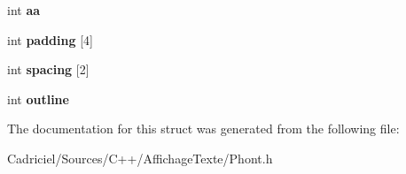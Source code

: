 \begin{DoxyCompactItemize}
\item 
\hypertarget{struct_phont_1_1phont__bfg__info_a6937675953e7501f7f14e4efcf6bc7f8}{int {\bfseries aa}}\label{struct_phont_1_1phont__bfg__info_a6937675953e7501f7f14e4efcf6bc7f8}

\item 
\hypertarget{struct_phont_1_1phont__bfg__info_a1daca76b1dab82e1da6854b1ee7ce9b4}{int {\bfseries padding} \mbox{[}4\mbox{]}}\label{struct_phont_1_1phont__bfg__info_a1daca76b1dab82e1da6854b1ee7ce9b4}

\item 
\hypertarget{struct_phont_1_1phont__bfg__info_a6576101d6775674ca50031e7911655da}{int {\bfseries spacing} \mbox{[}2\mbox{]}}\label{struct_phont_1_1phont__bfg__info_a6576101d6775674ca50031e7911655da}

\item 
\hypertarget{struct_phont_1_1phont__bfg__info_a854c5a4796b154dbfd3651d6338c7987}{int {\bfseries outline}}\label{struct_phont_1_1phont__bfg__info_a854c5a4796b154dbfd3651d6338c7987}

\end{DoxyCompactItemize}


The documentation for this struct was generated from the following file\-:\begin{DoxyCompactItemize}
\item 
Cadriciel/\-Sources/\-C++/\-Affichage\-Texte/Phont.\-h\end{DoxyCompactItemize}
